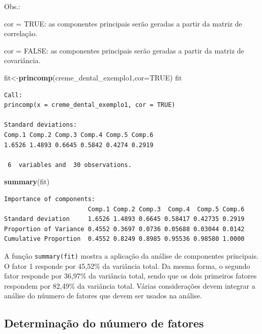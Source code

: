 \documentclass[12pt,brazil,oneside]{book}
\newenvironment{Shaded}{\begin{snugshade}}{\end{snugshade}}
\newcommand{\DataTypeTok}[1]{\textcolor[rgb]{0.13,0.29,0.53}{#1}}
\newcommand{\KeywordTok}[1]{\textcolor[rgb]{0.13,0.29,0.53}{\textbf{#1}}}
\newcommand{\NormalTok}[1]{#1}
\newcommand{\OtherTok}[1]{\textcolor[rgb]{0.56,0.35,0.01}{#1}}
\begin{document}
Obs.:

cor = TRUE: as componentes principais serão geradas a partir da matriz de correlação.

cor = FALSE: as componentes principais serão geradas a partir da matriz de covariância.

\begin{Shaded}
\begin{Highlighting}[]
\NormalTok{fit<-}\KeywordTok{princomp}\NormalTok{(creme_dental_exemplo1,}\DataTypeTok{cor=}\OtherTok{TRUE}\NormalTok{)}
\NormalTok{fit}
\end{Highlighting}
\end{Shaded}

\begin{verbatim}
Call:
princomp(x = creme_dental_exemplo1, cor = TRUE)

Standard deviations:
Comp.1 Comp.2 Comp.3 Comp.4 Comp.5 Comp.6 
1.6526 1.4893 0.6645 0.5842 0.4274 0.2919 

 6  variables and  30 observations.
\end{verbatim}

\begin{Shaded}
\begin{Highlighting}[]
\KeywordTok{summary}\NormalTok{(fit)}
\end{Highlighting}
\end{Shaded}

\begin{verbatim}
Importance of components:
                       Comp.1 Comp.2 Comp.3  Comp.4  Comp.5 Comp.6
Standard deviation     1.6526 1.4893 0.6645 0.58417 0.42735 0.2919
Proportion of Variance 0.4552 0.3697 0.0736 0.05688 0.03044 0.0142
Cumulative Proportion  0.4552 0.8249 0.8985 0.95536 0.98580 1.0000
\end{verbatim}

A função \texttt{summary(fit)} mostra a aplicação da análise de componentes principais. O fator 1
responde por 45,52\% da variância total. Da mesma forma, o segundo fator responde por 36,97\% da
variância total, sendo que os dois primeiros fatores respondem por 82,49\% da variância total. Várias
considerações devem integrar a análise do núumero de fatores que devem ser usados na análise.

\hypertarget{determinacao-do-nuumero-de-fatores}{%
\subsection{Determinação do núumero de fatores}\label{determinacao-do-nuumero-de-fatores}}
\end{document}
